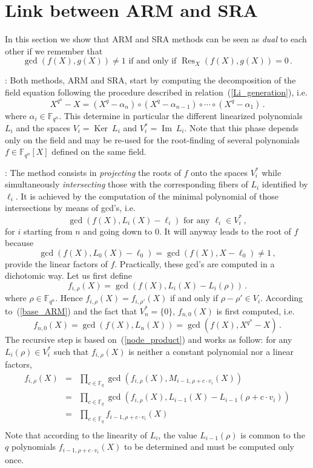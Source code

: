 \documentclass{sig-alternate}
\newcommand{\ff}[1]{\mathbb{F}_{#1}}
\newcommand{\qq}{q}
\newcommand{\nn}{n}
\newcommand{\qn}{{\qq^\nn}}
\newcommand{\basef}{\ff{\qq}}
\newcommand{\extf}{\ff{\qn}}
\DeclareMathOperator{\Ker}{Ker}
\DeclareMathOperator{\Ima}{Im}
\DeclareMathOperator{\Res}{Res}
\begin{document}
\section{Link between ARM and SRA}

In this section we show that ARM and SRA methods can be seen as
\emph{dual} to each other if we remember that
$$\gcd(f(X),g(X)) \ne 1 \mbox{  if and only if }\Res_X(f(X),g(X))=0\,.$$

\medskip

: Both methods, ARM and SRA, start by computing the decomposition of the field equation following the procedure described in relation~(\ref{Li_generation}), i.e.
 $$X^{\qn}-X=(X^\qq - \alpha_\nn) \circ (X^\qq - \alpha_{\nn-1}) \circ \cdots \circ (X^\qq - \alpha_1) \,.$$
where $\alpha_i \in \extf$. This determine in particular the different linearized polynomials $L_i$ and the spaces $V_i=\Ker~L_i$ and $V_i^\ast=\Ima~L_i$. Note that this phase depends only on the field and may be re-used for the root-finding of several polynomials $f \in \extf[X]$ defined on the same field.

\medskip

: The method consists in \emph{projecting} the roots of $f$ onto the spaces $V_i^\ast$ while simultaneously \emph{intersecting} those with the corresponding fibers of $L_i$ identified by $\ell_i$.
 It is achieved by the computation of the minimal polynomial of those intersections by means of gcd's, i.e. 
 \begin{equation}
 \label{base_ARM}
\gcd(f(X),L_i(X)-\ell_i)     \mbox{ for any }  \ell_i  \in V_i^\ast\,,
\end{equation}
for $i$ starting from $n$ and going down to 0.
It will anyway leads to the root of $f$ because 
$$\gcd(f(X),L_0(X)-\ell_0)=\gcd(f(X),X-\ell_0) \ne 1\,,$$ 
provide the linear factors of $f$. Practically, these gcd's are computed in a dichotomic way. Let us first define
 $$f_{i,\rho}(X)=\gcd(f(X),L_i(X)-L_i(\rho))\,.$$
where $\rho \in \extf$. Hence $f_{i,\rho}(X)=f_{i,\rho'}(X)$ if and only if $\rho-\rho' \in V_i$.
According to~(\ref{base_ARM}) and the fact that $V_n^\ast=\{0\}$, $f_{n,0}(X)$ is first computed, i.e.
 $$f_{n,0}(X)=\gcd(f(X),L_n(X))=\gcd(f(X),X^{q^\nn}-X)\,.$$
The recursive step is based on~(\ref{node_product}) and works as follow: for any $L_i(\rho) \in V_i^\ast$ such that $f_{i,\rho}(X)$ is neither a constant polynomial nor a linear factors,
  $$
  \begin{array}{lll}
  f_{i,\rho}(X)&=&\prod_{c \in \basef} \gcd(f_{i,\rho}(X),M_{i-1,\rho+c \cdot v_i}(X)) \\
               &=&\prod_{c \in \basef} \gcd(f_{i,\rho}(X),L_{i-1}(X)-L_{i-1}(\rho+c \cdot v_i)) \\
               &=&\prod_{c \in \basef} f_{i-1,\rho+c \cdot  v_i}(X)\\
  \end{array}              
  $$ 
 Note that according to the linearity of $L_i$, the value $L_{i-1}(\rho)$ is common to the $\qq$ polynomials $f_{i-1,\rho+c \cdot  v_i}(X)$ to be determined and must be computed only once. 
 
\end{document}
